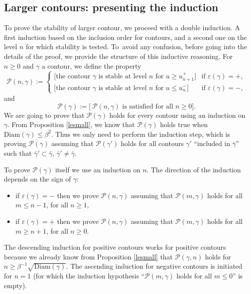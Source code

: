 \documentclass[JEP,XML,SOM,Unicode, NoFloatCountersInSection]{cedram}
\let\mathcal\mathscr
\numberwithin{equation}{section}
\theoremstyle{plain}
\theoremstyle{definition}
\newcommand{\Diam}{\mathrm{Diam}}
\newcommand{\cP}{{\ensuremath{\mathcal P}} }
\newcommand{\gb}{\beta}
\newcommand{\gep}{\varepsilon}
\begin{document}
\subsection{Larger contours: presenting the induction}\label{prezent}

To prove the stability of larger contour, we proceed with a double induction. A first induction based on the inclusion order for contours,
and a second one on the level $n$ for which stability is tested. To~avoid any confusion, before going into the details of the proof,
we provide the structure of this inductive reasoning.
For $n\ge 0$ and $\gamma$ a contour, we define the property
\begin{equation*}
\cP(n,\gamma):=\begin{cases}
\big[ \text{the contour } \gamma \text{ is stable at level } n \text{ for } u\ge u^+_{n+1} \big] &\text{if } \gep(\gamma)=+,\\
\big[ \text{the contour } \gamma \text{ is stable at level } n \text{ for } u\le u^-_{n} \big] &\text{if } \gep(\gamma)=-,
\end{cases}
\end{equation*}
and
\begin{equation*}
\cP(\gamma):=\big[ \ \cP(n,\gamma) \text{ is satisfied for all } n\ge 0 \big].
\end{equation*}
We are going to prove that $\cP(\gamma)$ holds for every contour using an induction on $\gamma$.
From Proposition \ref{lesmall}, we know that $\cP(\gamma)$ holds true when $\Diam(\gamma)\le \gb^2$.
Thus we only need to perform the induction step, which is proving $\cP(\gamma)$ assuming that
$\cP(\gamma')$ holds for all contours $\gamma'$ ``included in $\bar \gamma$'' \ie such that $\bar \gamma' \subset \bar \gamma$, $\bar \gamma'\ne \bar\gamma$.

To prove $\cP(\gamma)$ itself we use an induction on $n$.
The direction of the induction depends on the sign of $\gamma$:
\begin{itemize}
\item if $\gep(\gamma)=-$ then we prove $\cP(n,\gamma)$ assuming that $\cP(m,\gamma)$ holds for all $m\le n-1$, for all $n\ge 1$,
\item if $\gep(\gamma)=+$ then we prove $\cP(n,\gamma)$ assuming that $\cP(m,\gamma)$ holds for all $m\ge n+1$, for all $n\ge 0$.
\end{itemize}
The descending induction for positive contours works for positive contours because we already know from Proposition \ref{lesmall} that $\cP(\gamma,n)$ holds for
$n\ge \gb^{-1} \sqrt{\Diam(\gamma)}$. The ascending induction for negative contours is initiated for $n=1$ (for which the induction hypothesis
``$\cP(m,\gamma)$ holds for all $m\le 0$'' is empty).
\end{document}
